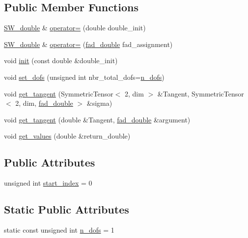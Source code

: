\subsection*{Public Member Functions}
\begin{DoxyCompactItemize}
\item 
\hyperlink{classSacado__Wrapper_1_1SW__double}{S\+W\+\_\+double} \& \hyperlink{classSacado__Wrapper_1_1SW__double_a355de495ebe0e0b78ea4569fbb697717}{operator=} (double double\+\_\+init)
\item 
\hyperlink{classSacado__Wrapper_1_1SW__double}{S\+W\+\_\+double} \& \hyperlink{classSacado__Wrapper_1_1SW__double_ae9d242c29208f994f2eaabd9f5d5fa3c}{operator=} (\hyperlink{Sacado__example_8cc_a868b94676739e612d9c95940e70892a9}{fad\+\_\+double} fad\+\_\+assignment)
\item 
void \hyperlink{classSacado__Wrapper_1_1SW__double_adca799dd92dadebda9aebc91c797682a}{init} (const double \&double\+\_\+init)
\item 
void \hyperlink{classSacado__Wrapper_1_1SW__double_a36ced4218d40104fd8e548039a97cfb8}{set\+\_\+dofs} (unsigned int nbr\+\_\+total\+\_\+dofs=\hyperlink{classSacado__Wrapper_1_1SW__double_a45e46904e5fd5be42bb4c9bb7454ffc5}{n\+\_\+dofs})
\item 
void \hyperlink{classSacado__Wrapper_1_1SW__double_a2e6eca4457eb22b06172bb5749038f1e}{get\+\_\+tangent} (Symmetric\+Tensor$<$ 2, dim $>$ \&Tangent, Symmetric\+Tensor$<$ 2, dim, \hyperlink{Sacado__example_8cc_a868b94676739e612d9c95940e70892a9}{fad\+\_\+double} $>$ \&sigma)
\item 
void \hyperlink{classSacado__Wrapper_1_1SW__double_a468303caab70c91f72bfe0547afff53a}{get\+\_\+tangent} (double \&Tangent, \hyperlink{Sacado__example_8cc_a868b94676739e612d9c95940e70892a9}{fad\+\_\+double} \&argument)
\item 
void \hyperlink{classSacado__Wrapper_1_1SW__double_ae7e9f33604ea736e485576447d78a46c}{get\+\_\+values} (double \&return\+\_\+double)
\end{DoxyCompactItemize}
\subsection*{Public Attributes}
\begin{DoxyCompactItemize}
\item 
unsigned int \hyperlink{classSacado__Wrapper_1_1SW__double_aa0927ce06528899dd44afe5d770840c1}{start\+\_\+index} = 0
\end{DoxyCompactItemize}
\subsection*{Static Public Attributes}
\begin{DoxyCompactItemize}
\item 
static const unsigned int \hyperlink{classSacado__Wrapper_1_1SW__double_a45e46904e5fd5be42bb4c9bb7454ffc5}{n\+\_\+dofs} = 1
\end{DoxyCompactItemize}


